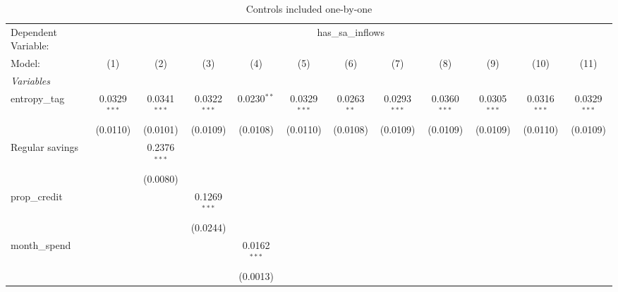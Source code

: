 
\begin{table}[htbp]
   \centering
   \caption{\label{tab:reg_sw0} Controls included one-by-one}
   \begin{tiny}
      \begin{tabular}{lccccccccccc}
         \tabularnewline\midrule\midrule
         Dependent Variable: & \multicolumn{11}{c}{has\_sa\_inflows}\\
         Model:                 & (1)            & (2)            & (3)            & (4)            & (5)            & (6)            & (7)            & (8)            & (9)            & (10)           & (11)\\
         \midrule \emph{Variables} &   &   &   &   &   &   &   &   &   &   &  \\
         entropy\_tag          & 0.0329$^{***}$ & 0.0341$^{***}$ & 0.0322$^{***}$ & 0.0230$^{**}$  & 0.0329$^{***}$ & 0.0263$^{**}$  & 0.0293$^{***}$ & 0.0360$^{***}$ & 0.0305$^{***}$ & 0.0316$^{***}$ & 0.0329$^{***}$\\
                                & (0.0110)       & (0.0101)       & (0.0109)       & (0.0108)       & (0.0110)       & (0.0108)       & (0.0109)       & (0.0109)       & (0.0109)       & (0.0110)       & (0.0109)\\
         Regular savings        &                & 0.2376$^{***}$ &                &                &                &                &                &                &                &                &   \\
                                &                & (0.0080)       &                &                &                &                &                &                &                &                &   \\
         prop\_credit          &                &                & 0.1269$^{***}$ &                &                &                &                &                &                &                &   \\
                                &                &                & (0.0244)       &                &                &                &                &                &                &                &   \\
         month\_spend          &                &                &                & 0.0162$^{***}$ &                &                &                &                &                &                &   \\
                                &                &                &                & (0.0013)       &                &                &                &                &                &                &   \\

\end{tabular}
\end{tiny}
\end{table}
